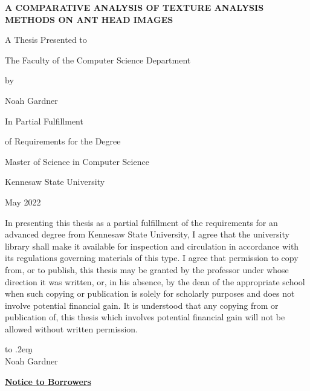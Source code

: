 \documentclass[12pt]{article}
\newcommand{\thesistitle}{
    {\Large A comparative analysis of texture analysis methods on
ant head images}
}
\newcommand{\toppage}{\vspace*{0.3in}}
\begin{document}
\toppage
\begin{center}
    \textbf{\MakeUppercase{\thesistitle}}
    \vspace{1in}

    A Thesis Presented to

    The Faculty of the Computer Science Department
    \vspace{1in}

    by
    \vspace{0.5in}

    Noah Gardner
    \vspace{1in}

    In Partial Fulfillment

    of Requirements for the Degree

    Master of Science in Computer Science

    \vspace{1in}
    Kennesaw State University

    May 2022
\end{center}
\thispagestyle{empty}
\newpage

\toppage
\noindent In presenting this thesis as a partial fulfillment of the requirements
for an advanced degree from Kennesaw State University, I agree that the
university library shall make it available for inspection and circulation in
accordance with its regulations governing materials of this type. I agree that
permission to copy from, or to publish, this thesis may be granted by the
professor under whose direction it was written, or, in his absence, by the dean
of the appropriate school when such copying or publication is solely for
scholarly purposes and does not involve potential financial gain. It is
understood that any copying from or publication of, this thesis which involves
potential financial gain will not be allowed without written permission.
\vspace{2in}

\def\dotsign{\xleaders\hbox to .2em{\d{}}\hfill\d{}}
\begin{center}
    \makebox[.5\linewidth][r]\dotsign\smallskip\\
    Noah Gardner
\end{center}
\newpage

\toppage
\begin{center}
    \textbf{\underline{Notice to Borrowers}}
\end{center}
\vspace{0.5in}
\end{document}
